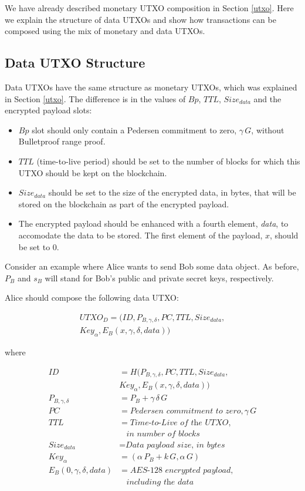 \documentclass[a4paper, 10pt, conference]{ieeeconf}
\begin{document}
We have already described monetary UTXO composition in Section \ref{utxo}. Here we explain the structure of data UTXOs and show how transactions can be composed using the mix of monetary and data UTXOs.

\subsection{Data UTXO Structure}

Data UTXOs have the same structure as monetary UTXOs, which was explained in Section \ref{utxo}. The difference is in the values of $Bp$, $TTL$, $Size_{data}$ and the encrypted payload slots:

\begin{itemize}
	\item {$Bp$ slot should only contain a Pedersen commitment to zero, $\gamma \, G$, without Bulletproof range proof.}
	\item {$TTL$ (time-to-live period) should be set to the number of blocks for which this UTXO should be kept on the blockchain.}
	\item {$Size_{data}$ should be set to the size of the encrypted data, in bytes, that will be stored on the blockchain as part of the encrypted payload.}
	\item {The encrypted payload should be enhanced with a fourth element, \textit{data}, to accomodate the data to be stored. The first element of the payload, $x$, should be set to 0.}
\end{itemize}

Consider an example where Alice wants to send Bob some data object. As before, $P_B$ and $s_B$ will stand for Bob's public and private secret keys, respectively. 

Alice should compose the following data UTXO:

\begin{multline*}
	UTXO_D = (ID, P_{B, \gamma, \delta}, PC, TTL, Size_{data},\\
			Key_{\alpha}, E_B(x, \gamma, \delta, data))
\end{multline*}
	
	where
	
\begin{align*}
	ID &= H(P_{B, \gamma, \delta}, PC, TTL, Size_{data}, \\ 
		& Key_{\alpha}, E_B(x, \gamma, \delta, data))\\
	P_{B, \gamma, \delta} &= P_B + \gamma \, \delta \, G \\
	PC &= \textit{Pedersen commitment to zero}, \gamma \, G \\
	TTL &= \textit{Time-to-Live of the UTXO},\\
	& \ \ \ \ \textit{in number of blocks} \\
	Size_{data} &= \textit{Data payload size, in bytes} \\
	Key_{\alpha} &= (\alpha \, P_{B} + k \, G, \alpha \, G ) \\
	E_B(0, \gamma, \delta, data) &= \textit{AES-128 encrypted payload}, \\
	& \ \ \ \ \textit{including the data}
\end{align*}
\end{document}
